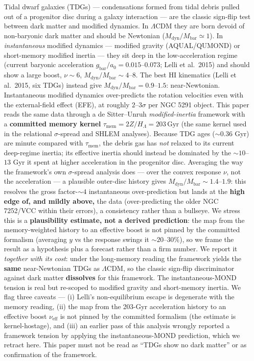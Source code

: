 \documentclass[
]{article}
\begin{document}
Tidal dwarf galaxies (TDGs) --- condensations formed from tidal debris
pulled out of a progenitor disc during a galaxy interaction --- are the
classic sign-flip test between dark matter and modified dynamics. In
\(\Lambda\)CDM they are born devoid of non-baryonic dark matter and
should be Newtonian (\(M_\mathrm{dyn}/M_\mathrm{bar}\simeq 1\)). In
\emph{instantaneous} modified dynamics --- modified gravity
(AQUAL/QUMOND) or short-memory modified inertia --- they sit deep in the
low-acceleration regime (current baryonic acceleration
\(g_\mathrm{bar}/a_0 = 0.015\)--\(0.073\); Lelli et al.~2015) and should
show a large boost, \(\nu\!\sim\!6\),
\(M_\mathrm{dyn}/M_\mathrm{bar}\sim 4\)--\(8\). The best HI kinematics (Lelli
et al.~2015, six TDGs) instead give
\(M_\mathrm{dyn}/M_\mathrm{bar}=0.9\)--\(1.5\): near-Newtonian. Instantaneous
modified dynamics over-predicts the rotation velocities even with the
external-field effect (EFE), at roughly \(2\)--\(3\sigma\) per NGC 5291
object. This paper reads the same data through a de Sitter--Unruh
\emph{modified-inertia} framework with a \textbf{committed memory
kernel} \(\tau_\mathrm{mem}=2Z/H_\Lambda = 203\,\mathrm{Gyr}\) (the same
kernel used in the relational \(\sigma\)-spread and SHLEM analyses).
Because TDG ages (\(\sim\!0.36\) Gyr) are minute compared with
\(\tau_\mathrm{mem}\), the debris gas has \emph{not} relaxed to its current
deep-regime inertia; its effective inertia should instead be dominated
by the \(\sim\!10\)--\(13\) Gyr it spent at higher acceleration in the
progenitor disc. Averaging the way the framework's own \(\sigma\)-spread
analysis does --- over the convex response \(\nu\), not the acceleration
--- a plausible outer-disc history gives
\(M_\mathrm{dyn}/M_\mathrm{bar}\sim 1.4\)--\(1.9\): this resolves the gross
factor-\(\sim\!4\) instantaneous over-prediction but lands at the
\textbf{high edge of, and mildly above,} the data (over-predicting the
older NGC 7252/VCC within their errors), a consistency rather than a
bullseye. We stress this is a \textbf{plausibility estimate, not a
derived prediction}: the map from the memory-weighted history to an
effective boost is not pinned by the committed formalism (averaging
\(y\) vs the response swings it \(\sim\!20\)--\(30\%\)), so we frame the
result as a hypothesis plus a forecast rather than a firm number. We
report it \emph{together with its cost}: under the long-memory reading
the framework yields the \textbf{same} near-Newtonian TDGs as
\(\Lambda\)CDM, so the classic sign-flip discriminator against dark
matter \textbf{dissolves} for this framework. The instantaneous-MOND
tension is real but re-scoped to modified gravity and short-memory
inertia. We flag three caveats --- (i) Lelli's non-equilibrium escape is
degenerate with the memory reading, (ii) the map from the 203-Gyr
acceleration history to an effective boost \(\nu_\mathrm{eff}\) is not
pinned by the committed formalism (the estimate is kernel-hostage), and
(iii) an earlier pass of this analysis wrongly reported a framework
tension by applying the instantaneous-MOND prediction, which we retract
here. This paper must not be read as ``TDGs show no dark matter'' or as
confirmation of the framework.
\end{document}
